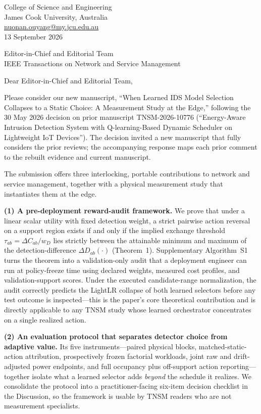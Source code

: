 \documentclass[11pt]{article}
\begin{document}
\thispagestyle{empty}

\begin{flushright}
College of Science and Engineering\\
James Cook University, Australia\\
\href{mailto:nuonan.ouyang@my.jcu.edu.au}{nuonan.ouyang@my.jcu.edu.au}\\
13 September 2026
\end{flushright}

\vspace{4pt}
Editor-in-Chief and Editorial Team\\
IEEE Transactions on Network and Service Management

\vspace{6pt}
Dear Editor-in-Chief and Editorial Team,

Please consider our new manuscript, ``When Learned IDS Model Selection Collapses to a Static Choice: A Measurement Study at the Edge,'' following the 30 May 2026 decision on prior manuscript TNSM-2026-10776 (``Energy-Aware Intrusion Detection System with Q-learning-Based Dynamic Scheduler on Lightweight IoT Devices''). The decision invited a new manuscript that fully considers the prior reviews; the accompanying response maps each prior comment to the rebuilt evidence and current manuscript.

The submission offers three interlocking, portable contributions to network and service management, together with a physical measurement study that instantiates them at the edge.

\textbf{(1) A pre-deployment reward-audit framework.} We prove that under a linear scalar utility with fixed detection weight, a strict pairwise action reversal on a support region exists if and only if the implied exchange threshold $\tau_{ab}=\Delta C_{ab}/w_D$ lies strictly between the attainable minimum and maximum of the detection-difference $\Delta D_{ab}(\cdot)$ (Theorem~1). Supplementary Algorithm~S1 turns the theorem into a validation-only audit that a deployment engineer can run at policy-freeze time using declared weights, measured cost profiles, and validation-support scores. Under the executed candidate-range normalization, the audit correctly predicts the LightLR collapse of both learned selectors before any test outcome is inspected---this is the paper's core theoretical contribution and is directly applicable to any TNSM study whose learned orchestrator concentrates on a single realized action.

\textbf{(2) An evaluation protocol that separates detector choice from adaptive value.} Its five instruments---paired physical blocks, matched-static-action attribution, prospectively frozen factorial workloads, joint raw and drift-adjusted power endpoints, and full occupancy plus off-support action reporting---together isolate what a learned selector adds \emph{beyond} the schedule it realizes. We consolidate the protocol into a practitioner-facing six-item decision checklist in the Discussion, so the framework is usable by TNSM readers who are not measurement specialists.
\end{document}
